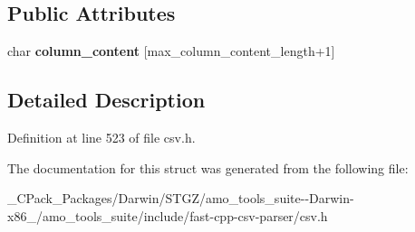 \subsection*{Public Attributes}
\begin{DoxyCompactItemize}
\item 
\mbox{\label{structio_1_1error_1_1with__column__content_a15e89501af0f55971c2d7007b2319634}} 
char {\bfseries column\+\_\+content} \mbox{[}max\+\_\+column\+\_\+content\+\_\+length+1\mbox{]}
\end{DoxyCompactItemize}


\subsection{Detailed Description}


Definition at line 523 of file csv.\+h.



The documentation for this struct was generated from the following file\+:\begin{DoxyCompactItemize}
\item 
\+\_\+\+C\+Pack\+\_\+\+Packages/\+Darwin/\+S\+T\+G\+Z/amo\+\_\+tools\+\_\+suite-\/-\/\+Darwin-\/x86\+\_/amo\+\_\+tools\+\_\+suite/include/fast-\/cpp-\/csv-\/parser/csv.\+h\end{DoxyCompactItemize}
